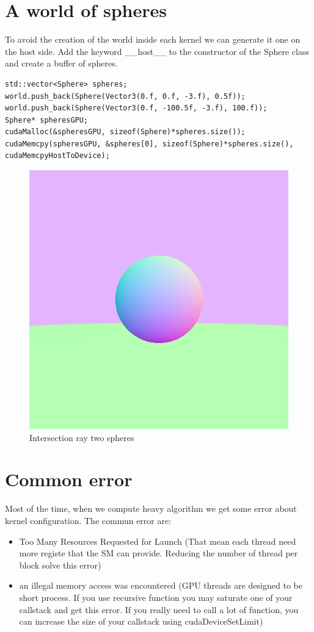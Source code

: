 \documentclass{article}
\begin{document}
\section{A world of spheres}
To avoid the creation of the world inside each kernel we can generate it one on the host side. Add the keyword \_\_host\_\_ to the constructor of the Sphere class and create a buffer of spheres. 
\begin{lstlisting}
std::vector<Sphere> spheres;
world.push_back(Sphere(Vector3(0.f, 0.f, -3.f), 0.5f));
world.push_back(Sphere(Vector3(0.f, -100.5f, -3.f), 100.f));
Sphere* spheresGPU;
cudaMalloc(&spheresGPU, sizeof(Sphere)*spheres.size());
cudaMemcpy(spheresGPU, &spheres[0], sizeof(Sphere)*spheres.size(), cudaMemcpyHostToDevice);
\end{lstlisting}
\begin{figure}[h]
	\centering
	\includegraphics[scale=0.6]{figures/intersectnormaltwosphere.png}
	\caption{Intersection ray two spheres}
\end{figure}

\newpage
\section{Common error}
Most of the time, when we compute heavy algorithm we get some error about kernel configuration. The commun error are:
\begin{itemize}
	\item Too Many Resources Requested for Launch (That mean each thread need more registe that the SM can provide. Reducing the number of thread per block solve this error)
	\item an illegal memory access was encountered (GPU threads are designed to be short process. If you use recursive function you may saturate one of your callstack and get this error. If you really need to call a lot of function, you can increase the size of your callstack using cudaDeviceSetLimit)
\end{itemize}
\end{document}
